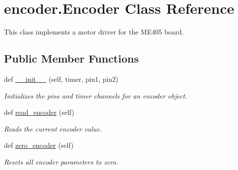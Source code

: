 \hypertarget{classencoder_1_1Encoder}{}\section{encoder.\+Encoder Class Reference}
\label{classencoder_1_1Encoder}


This class implements a motor driver for the M\+E405 board.  


\subsection*{Public Member Functions}
\begin{DoxyCompactItemize}
\item 
def \hyperlink{classencoder_1_1Encoder_a16573d613ec4bf625740119851e24c54}{\+\_\+\+\_\+init\+\_\+\+\_\+} (self, timer, pin1, pin2)
\begin{DoxyCompactList}\small\item\em Initializes the pins and timer channels for an encoder object. \end{DoxyCompactList}\item 
def \hyperlink{classencoder_1_1Encoder_aed2076559d6f0965f50943bc3b08c220}{read\+\_\+encoder} (self)
\begin{DoxyCompactList}\small\item\em Reads the current encoder value. \end{DoxyCompactList}\item 
def \hyperlink{classencoder_1_1Encoder_a95c70f54c321a9acfe4b4ab821afd4f2}{zero\+\_\+encoder} (self)
\begin{DoxyCompactList}\small\item\em Resets all encoder parameters to zero. \end{DoxyCompactList}\end{DoxyCompactItemize}

